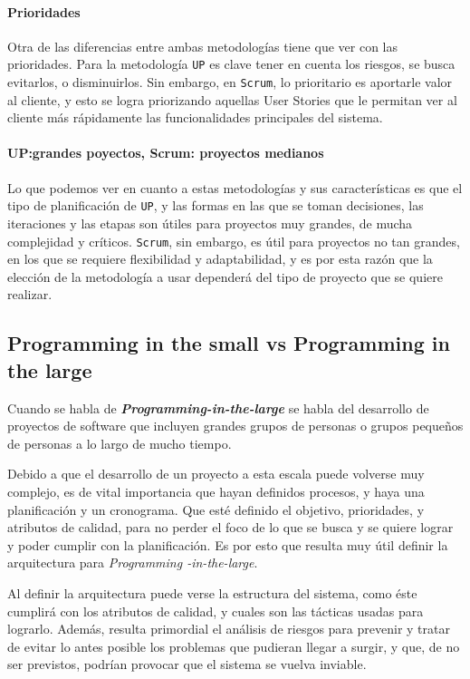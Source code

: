 \paragraph{Prioridades}
Otra de las diferencias entre ambas metodologías tiene que ver con las prioridades. Para la metodología \texttt{UP} es clave tener en cuenta los riesgos, se busca evitarlos, o disminuirlos. Sin embargo, en \texttt{Scrum}, lo prioritario es aportarle valor al cliente, y esto se logra priorizando aquellas User Stories que le permitan ver al cliente más rápidamente las funcionalidades principales del sistema.

\paragraph{UP:grandes poyectos, Scrum: proyectos medianos}
Lo que podemos ver en cuanto a estas metodologías y sus características es que el tipo de planificación de \texttt{UP}, y las formas en las que se toman decisiones, las iteraciones y las etapas son útiles para proyectos muy grandes, de mucha complejidad y críticos. \texttt{Scrum}, sin embargo, es útil para proyectos no tan grandes, en los que se requiere flexibilidad y adaptabilidad, y es por esta razón que la elección de la metodología a usar dependerá del tipo de proyecto que se quiere realizar.


\subsection{Programming in the small vs Programming in the large}

Cuando se habla de \emph{\textbf{Programming-in-the-large}} se habla del desarrollo de proyectos de software que incluyen grandes grupos de personas o grupos pequeños de personas a lo largo de mucho tiempo. \cite{Brooks}

Debido a que el desarrollo de un proyecto a esta escala puede volverse muy complejo, es de vital importancia que hayan definidos procesos, y haya una planificación y un cronograma. Que esté definido el objetivo, prioridades, y atributos de calidad, para no perder el foco de lo que se busca y se quiere lograr y poder cumplir con la planificación. 
Es por esto que resulta muy útil definir la arquitectura para \emph{Programming -in-the-large}.

Al definir la arquitectura puede verse la estructura del sistema, como éste cumplirá con los atributos de calidad, y cuales son las tácticas usadas para lograrlo.
Además, resulta primordial el análisis de riesgos para prevenir y tratar de evitar lo antes posible los problemas que pudieran llegar a surgir, y que, de no ser previstos, podrían provocar que el sistema se vuelva inviable.

